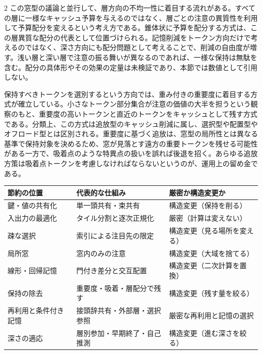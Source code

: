 \documentclass[lualatex,a4paper,10pt]{jlreq}
\begin{document}
\begin{multicols}{2}
この窓型の議論と並行して、層方向の不均一性に着目する流れがある。すべての層に一様なキャッシュ予算を与えるのではなく、層ごとの注意の異質性を利用して予算配分を変えるという考え方である。錐体状に予算を配分する方式は、この層異質な配分の代表として位置づけられる\autocite{pyramidkv}。記憶削減をトークン方向だけで考えるのではなく、深さ方向にも配分問題として考えることで、削減の自由度が増す。浅い層と深い層で注意の振る舞いが異なるのであれば、一様な保持は無駄を含む。配分の具体形やその効果の定量は未検証であり、本節では数値として引用しない。

保持すべきトークンを選別するという方向では、重み付きの重要度に着目する方式が確立している。小さなトークン部分集合が注意の価値の大半を担うという観察のもと、重要度の高いトークンと直近のトークンをキャッシュとして残す方式である\autocite{h2o}。分類上、この方式は追放型のキャッシュ削減に属し、選択型や配置型やオフロード型とは区別される。重要度に基づく追放は、窓型の局所性とは異なる基準で保持対象を決めるため、窓が見落とす遠方の重要トークンを残せる可能性がある一方で、吸着点のような特異点の扱いを誤れば後退を招く。あらゆる追放方策は吸着点トークンを考慮しなければならないというのが、運用上の留め金である。

\end{multicols}

\begin{center}
\small
\begin{tabularx}{\textwidth}{@{}p{}p{}X@{}}
\toprule
節約の位置 & 代表的な仕組み & 厳密か構造変更か \\
\midrule
鍵・値の共有化 & 単一頭共有・束共有 & 構造変更（保持を削る） \\
入出力の最適化 & タイル分割と逐次正規化 & 厳密（計算は変えない） \\
疎な選択 & 索引による注目先の限定 & 構造変更（見る場所を変える） \\
局所窓 & 窓内のみの注意 & 構造変更（大域を捨てる） \\
線形・回帰記憶 & 門付き差分と交互配置 & 構造変更（二次計算を置換） \\
保持の除去 & 重要度・吸着・層配分で残す & 構造変更（残す量を絞る） \\
再利用と条件付き記憶 & 接頭辞共有・外部層・選択参照 & 厳密な再利用と記憶の選択 \\
深さの適応 & 層別参加・早期終了・自己推測 & 構造変更（進む深さを絞る） \\
\bottomrule
\end{tabularx}
\end{center}
\autocite{mqa,gqa,flashattn,nsa,kimilinear,h2o,pyramidkv,engram}
\end{document}
